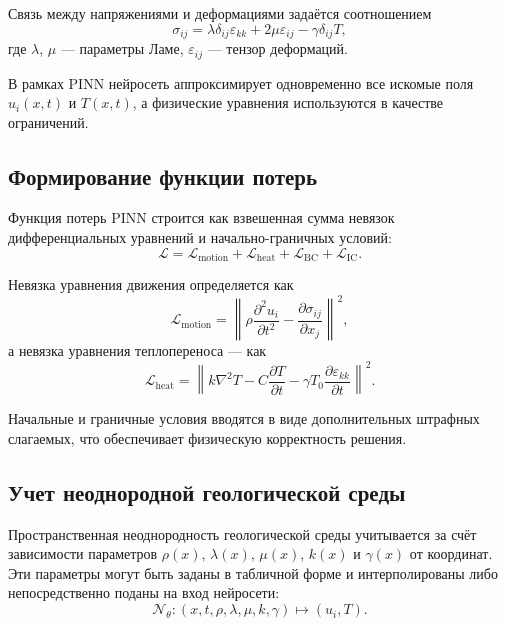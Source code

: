 \documentclass[12pt]{article}
\begin{document}
Связь между напряжениями и деформациями задаётся соотношением
\begin{equation}
\sigma_{ij} = \lambda \delta_{ij} \varepsilon_{kk} + 2\mu \varepsilon_{ij} - \gamma \delta_{ij} T,
\end{equation}
где $\lambda$, $\mu$ — параметры Ламе, $\varepsilon_{ij}$ — тензор деформаций.

В рамках PINN нейросеть аппроксимирует одновременно все искомые поля $u_i(x,t)$ и $T(x,t)$, а физические уравнения используются в качестве ограничений.

\subsection{Формирование функции потерь}

Функция потерь PINN строится как взвешенная сумма невязок дифференциальных уравнений и начально-граничных условий:
\begin{equation}
\mathcal{L} =
\mathcal{L}_{\text{motion}}
+ \mathcal{L}_{\text{heat}}
+ \mathcal{L}_{\text{BC}}
+ \mathcal{L}_{\text{IC}}.
\end{equation}

Невязка уравнения движения определяется как
\begin{equation}
\mathcal{L}_{\text{motion}} =
\left\|
\rho \frac{\partial^2 u_i}{\partial t^2}
- \frac{\partial \sigma_{ij}}{\partial x_j}
\right\|^2,
\end{equation}
а невязка уравнения теплопереноса — как
\begin{equation}
\mathcal{L}_{\text{heat}} =
\left\|
k \nabla^2 T
- C \frac{\partial T}{\partial t}
- \gamma T_0 \frac{\partial \varepsilon_{kk}}{\partial t}
\right\|^2.
\end{equation}

Начальные и граничные условия вводятся в виде дополнительных штрафных слагаемых, что обеспечивает физическую корректность решения.

\subsection{Учет неоднородной геологической среды}

Пространственная неоднородность геологической среды учитывается за счёт зависимости параметров $\rho(x)$, $\lambda(x)$, $\mu(x)$, $k(x)$ и $\gamma(x)$ от координат. Эти параметры могут быть заданы в табличной форме и интерполированы либо непосредственно поданы на вход нейросети:
\begin{equation}
\mathcal{N}_\theta : (x,t,\rho,\lambda,\mu,k,\gamma) \mapsto (u_i,T).
\end{equation}
\end{document}
